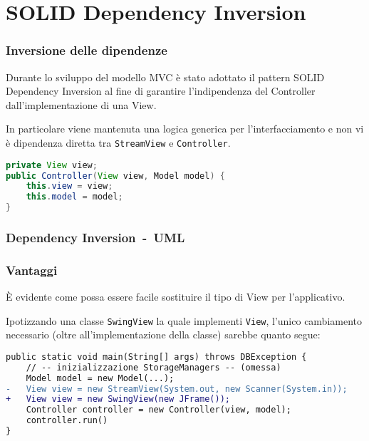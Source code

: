 \section{SOLID Dependency Inversion}
\begin{frame}[fragile]
    \frametitle{Inversione delle dipendenze}

    Durante lo sviluppo del modello MVC è stato adottato il pattern SOLID Dependency Inversion al fine di garantire l'indipendenza del Controller dall'implementazione di una View.\pause%
    
    In particolare viene mantenuta una logica generica per l'interfacciamento e non vi è dipendenza diretta tra \texttt{StreamView} e \texttt{Controller}.\pause%

    \lstset{style=java}
    \begin{lstlisting}[language=java, caption={Snippet tratto dal costruttore di Controller}]
private View view;
public Controller(View view, Model model) {
    this.view = view;
    this.model = model;
}
    \end{lstlisting}
\end{frame}

\begin{frame}
    \frametitle{Dependency Inversion~-~UML}
    \begin{figure}
        \centering
    \end{figure}
\end{frame}

\begin{frame}[fragile]
    \frametitle{Vantaggi}

    È evidente come possa essere facile sostituire il tipo di View per l'applicativo.

    Ipotizzando una classe \texttt{SwingView} la quale implementi \texttt{View}, l'unico cambiamento necessario (oltre all'implementazione della classe) sarebbe quanto segue:

    \lstset{style=java}
    \begin{lstlisting}[language=diff, caption={EntryPoint.java\#main}]
public static void main(String[] args) throws DBException {
    // -- inizializzazione StorageManagers -- (omessa)
    Model model = new Model(...);
-   View view = new StreamView(System.out, new Scanner(System.in));
+   View view = new SwingView(new JFrame());
    Controller controller = new Controller(view, model);
    controller.run()
}
    \end{lstlisting}
\end{frame}